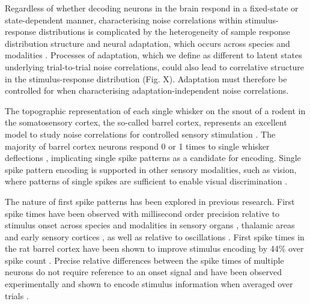 \documentclass{article}
\begin{document}


Regardless of whether decoding neurons in the brain respond in a fixed-state or state-dependent manner, characterising noise correlations within stimulus-response distributions is complicated by the heterogeneity of sample response distribution structure and neural adaptation, which occurs across species and modalities \cite{dragoi2002dynamics, ulanovsky2003processing, sharpee2006adaptive}. 
Processes of adaptation, which we define as different to latent states underlying trial-to-trial noise correlations, could also lead to correlative structure in the stimulus-response distribution (Fig. X). Adaptation must therefore be controlled for when characterising adaptation-independent noise correlations.

The topographic representation of each single whisker on the snout of a rodent in the somatosensory cortex, the so-called barrel cortex, represents an excellent model to study noise correlations for controlled sensory stimulation \cite{feldmeyer2013barrel}. 
The majority of barrel cortex neurons respond 0 or 1 times to single whisker deflections \cite{reyes2014laminar}, implicating single spike patterns as a candidate for encoding. Single spike pattern encoding is supported in other sensory modalities, such as vision, where patterns of single spikes are sufficient to enable visual discrimination \cite{resulaj2018first}. 

The nature of first spike patterns has been explored in previous research. First spike times have been observed with millisecond order precision relative to stimulus onset across species and modalities in sensory organs \cite{johansson2004first, uzzell2004precision, gollisch2008rapid}, thalamic areas \cite{reinagel2002precise, storchi2012comparison} and early sensory cortices \cite{reyes2014laminar}, as well as relative to oscillations \cite{havenith2011synchrony}. First spike times in the rat barrel cortex have been shown to improve stimulus encoding by 44\% over spike count \cite{panzeri2001role}. Precise relative differences between the spike times of multiple neurons \cite{izhikevich2006polychronization} do not require reference to an onset signal and have been observed experimentally \cite{johansson2004first, gollisch2008rapid, reyes2014laminar} and shown to encode stimulus information when averaged over trials \cite{gollisch2008rapid}. 
\end{document}
